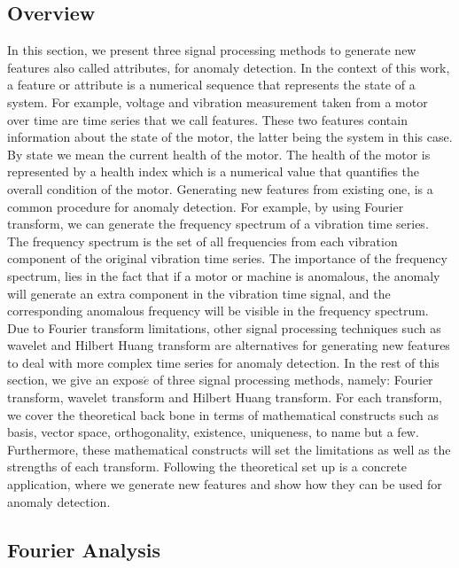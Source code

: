 \documentclass[11pt, oneside]{article}   	%
\begin{document}
\subsection{Overview}
 In this section, we present three signal processing methods to generate new features also called attributes, for anomaly detection. In the context of this work, a feature or attribute is a numerical sequence that represents the state of a system. For example, voltage and vibration measurement taken from a motor over time are time series that we call features. These two features contain information about the state of the motor, the latter being the system in this case. 
 By state we mean the current health of the motor. The health of the motor is represented by a health index which is a numerical value that quantifies the overall condition of the motor.
 \justify
 Generating new features from existing one, is a common procedure for anomaly detection. For example, by using Fourier transform, we can generate the frequency spectrum of a vibration time series. The frequency spectrum is the set of all frequencies from each vibration component of the original vibration time series. The importance of the frequency spectrum, lies in the fact that if a motor or machine is anomalous, the anomaly will generate an extra component in the vibration time signal, and the corresponding anomalous frequency will be visible in the frequency spectrum. Due to Fourier transform limitations, other signal processing techniques such as
  wavelet and Hilbert Huang transform are alternatives for generating new features to deal with more complex time series for anomaly detection.
 \justify
 In the rest of this section, we give an expos$\acute{e}$  of three signal processing methods, namely: Fourier transform, wavelet transform and Hilbert Huang transform. For each transform, we cover the theoretical back bone in terms of mathematical constructs such as basis, vector space, orthogonality, existence, uniqueness, to name but a few. Furthermore, these mathematical constructs will set the limitations as well as the strengths of each transform. Following the theoretical set up is a concrete application, where we generate new features and show how they can be used for anomaly detection.
 


\subsection{Fourier Analysis}
\end{document}
